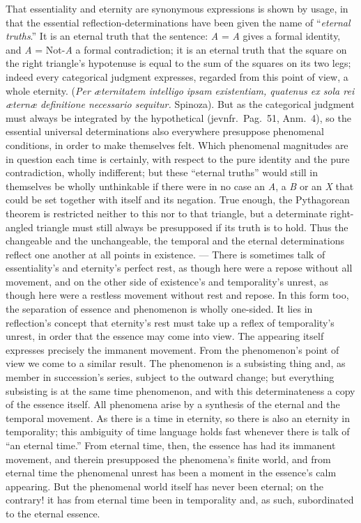 \documentclass[12pt]{book}
\begin{document}
That essentiality and eternity are synonymous expressions is shown by
usage, in that the essential reflection-determinations have been given the
name of ``\emph{eternal truths}.'' It is an eternal truth that the sentence:
\textit{A} = \textit{A} gives a formal identity, and \textit{A} =
Not-\textit{A} a formal contradiction; it is an eternal truth that the
square on the right triangle's hypotenuse is equal to the sum of the squares
on its two legs; indeed every categorical judgment expresses, regarded from
this point of view, a whole eternity. (\textit{Per æternitatem intelligo
ipsam existentiam, quatenus ex sola rei æternæ definitione necessario
sequitur.} Spinoza). But as the categorical judgment must always be
integrated by the hypothetical (jevnfr.\ Pag.\ 51, Anm.\ 4), so the
essential universal determinations also everywhere presuppose phenomenal
conditions, in order to make themselves felt. Which phenomenal magnitudes
are in question each time is certainly, with respect to the pure identity
and the pure contradiction, wholly indifferent; but these ``eternal
truths'' would still in themselves be wholly unthinkable if there were in no
case an \textit{A}, a \textit{B} or an \textit{X} that could be set together
with itself and its negation. True enough, the Pythagorean theorem is
restricted neither to this nor to that triangle, but a determinate
right-angled triangle must still always be presupposed if its truth is to
hold. Thus the changeable and the unchangeable, the temporal and the eternal
determinations reflect one another at all points in existence. --- There is
sometimes talk of essentiality's and eternity's perfect rest, as though here
were a repose without all movement, and on the other side of existence's and
temporality's unrest, as though here were a restless movement without rest
and repose. In this form too, the separation of essence and phenomenon is
wholly one-sided. It lies in reflection's concept that eternity's rest must
take up a reflex of temporality's unrest, in order that the essence may come
into view. The appearing itself expresses precisely the immanent movement.
From the phenomenon's point of view we come to a similar result. The
phenomenon is a subsisting thing and, as member in succession's series,
subject to the outward change; but everything subsisting is at the same time
phenomenon, and with this determinateness a copy of the essence itself. All
phenomena arise by a synthesis of the eternal and the temporal movement. As
there is a time in eternity, so there is also an eternity in temporality;
this ambiguity of time language holds fast whenever there is talk of ``an
eternal time.'' From eternal time, then, the essence has had its immanent
movement, and therein presupposed the phenomena's finite world, and from
eternal time the phenomenal unrest has been a moment in the essence's calm
appearing. But the phenomenal world itself has never been eternal; on the
contrary! it has from eternal time been in temporality and, as such,
subordinated to the eternal essence.
\end{document}
